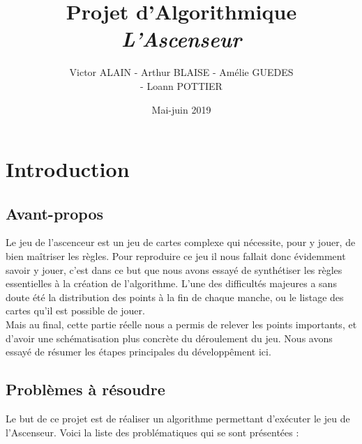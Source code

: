 \documentclass[12pt]{report}
\title{Projet d'Algorithmique \\ \textit{L'Ascenseur} }
\date{Mai-juin 2019}
\author{Victor \textsc{ALAIN} - Arthur \textsc{BLAISE} - Amélie \textsc{GUEDES} \\ - Loann \textsc{POTTIER}}
\renewcommand{\thesection}{\Roman{section}}
\begin{document}
\renewcommand{\thesection}{\textbf{\arabic{section}}} %

\maketitle
\tableofcontents

\clearpage


\section{Introduction}

\subsection{Avant-propos}
	Le jeu de l'ascenceur est un jeu de cartes complexe qui nécessite, pour y jouer, de bien maîtriser les règles. Pour reproduire ce jeu il nous fallait donc évidemment savoir y jouer, c'est dans ce but que nous avons essayé de synthétiser les règles essentielles à la création de l'algorithme. L'une des difficultés majeures a sans doute été la distribution des points à la fin de chaque manche, ou le listage des cartes qu'il est possible de jouer.\\
	
	Mais au final, cette partie réelle nous a permis de relever les points importants, et d'avoir une schématisation plus concrète du déroulement du jeu. Nous avons essayé de résumer les étapes principales du développêment ici.

	
\subsection{Problèmes à résoudre}
	
	Le but de ce projet est de réaliser un algorithme permettant d'exécuter le jeu de l'Ascenseur. Voici la liste des problématiques qui se sont présentées :\\
	
\end{document}
